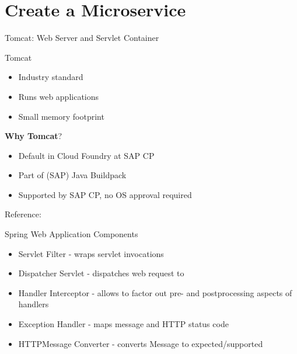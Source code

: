 \part{Create a Microservice}

\begin{frame}{Tomcat: Web Server and Servlet Container}
\begin{block}{Tomcat}
\begin{itemize}
\item Industry standard
\item Runs web applications
\item Small memory footprint
\end{itemize}
\end{block}

\vfill

\textbf{Why Tomcat}?
\begin{itemize}
\item Default in Cloud Foundry at SAP CP
\item Part of (SAP) Java Buildpack
\item Supported by SAP CP, no OS approval required
\end{itemize}

\vfill
Reference: 
\end{frame}


\begin{frame}[fragile]{Spring Web Application Components}
\begin{figure}
\end{figure}
\vfill
\scriptsize
\begin{itemize}
\item Servlet Filter - wraps servlet invocations
\item Dispatcher Servlet - dispatches web request to 
\item Handler Interceptor - allows to factor out pre- and postprocessing aspects of handlers
\item Exception Handler - maps message and HTTP status code
\item HTTPMessage Converter - converts Message to expected/supported 
\end{itemize}
\end{frame}


